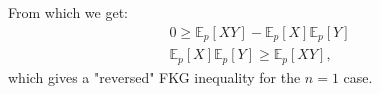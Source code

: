 \documentclass[11pt]{article}
\begin{document}
From which we get:
\begin{align*}
    0 \geq \mathbb{E}_p[XY]-\mathbb{E}_p[X]\mathbb{E}_p[Y]\\
    \mathbb{E}_p[X]\mathbb{E}_p[Y] \geq \mathbb{E}_p[XY],
\end{align*}
which gives a "reversed" FKG inequality for the $n=1$ case. \\
\end{document}
